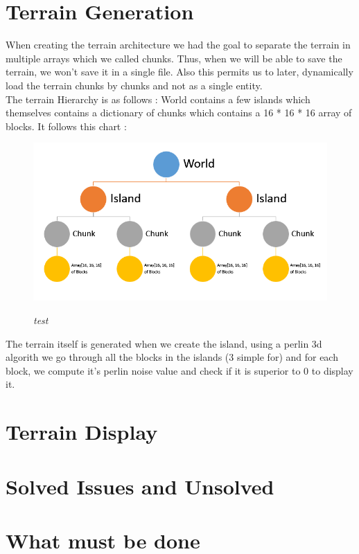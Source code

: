 \documentclass[article]{report} %
\begin{document}
			\section{Terrain Generation}
				When creating the terrain architecture we had the goal to separate the terrain in multiple arrays which we called chunks. Thus, when we will be able to save the terrain, we won't save it in a single file. Also this permits us to later, dynamically load the terrain chunks by chunks and not as a single entity. \\

				The terrain Hierarchy is as follows : World contains a few islands which themselves contains a dictionary of chunks which contains a 16 * 16 * 16 array of blocks. It follows this chart : 
				\begin{figure}[h]
					\includegraphics[width=18cm]{Images/WorldHierarchy.png}
					\begin{center}\it test \end{center}
				\end{figure}

				The terrain itself is generated when we create the island, using a perlin 3d algorith we go through all the blocks in the islands (3 simple for) and for each block, we compute it's perlin noise value and check if it is superior to 0 to display it.
				
			\section{Terrain Display}

			\section{Solved Issues and Unsolved}			

			\section{What must be done}
\end{document}
